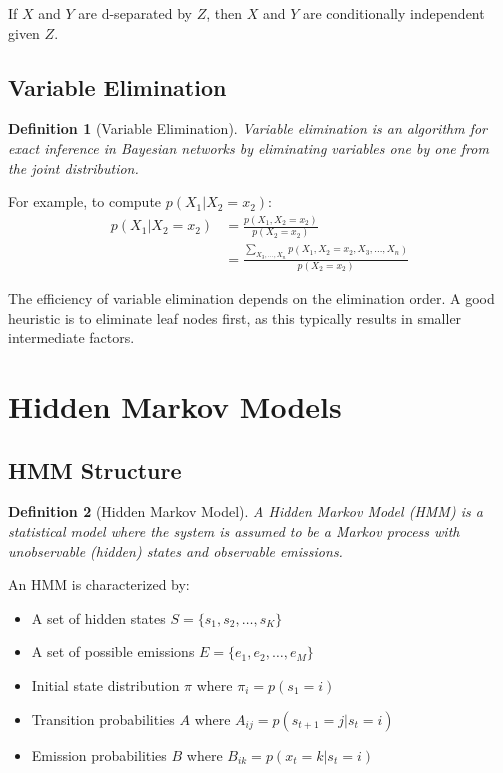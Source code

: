 \documentclass{article}
\newtheorem{definition}{Definition}
\begin{document}
If $X$ and $Y$ are d-separated by $Z$, then $X$ and $Y$ are conditionally independent given $Z$.

\subsection{Variable Elimination}
\begin{definition}[Variable Elimination]
Variable elimination is an algorithm for exact inference in Bayesian networks by eliminating variables one by one from the joint distribution.
\end{definition}

For example, to compute $p(X_1|X_2=x_2)$:
\begin{align}
p(X_1|X_2=x_2) &= \frac{p(X_1, X_2=x_2)}{p(X_2=x_2)}\\
&= \frac{\sum_{X_3, \ldots, X_n}p(X_1, X_2=x_2, X_3, \ldots, X_n)}{p(X_2=x_2)}
\end{align}

The efficiency of variable elimination depends on the elimination order. A good heuristic is to eliminate leaf nodes first, as this typically results in smaller intermediate factors.

\section{Hidden Markov Models}

\subsection{HMM Structure}
\begin{definition}[Hidden Markov Model]
A Hidden Markov Model (HMM) is a statistical model where the system is assumed to be a Markov process with unobservable (hidden) states and observable emissions.
\end{definition}

An HMM is characterized by:
\begin{itemize}
\item A set of hidden states $S = \{s_1, s_2, \ldots, s_K\}$
\item A set of possible emissions $E = \{e_1, e_2, \ldots, e_M\}$
\item Initial state distribution $\pi$ where $\pi_i = p(s_1 = i)$
\item Transition probabilities $A$ where $A_{ij} = p(s_{t+1} = j|s_t = i)$
\item Emission probabilities $B$ where $B_{ik} = p(x_t = k|s_t = i)$
\end{itemize}
\end{document}
